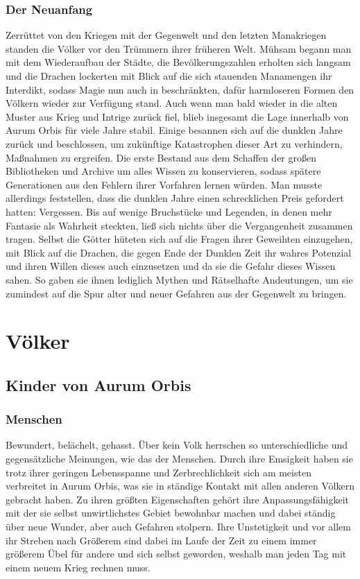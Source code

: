 \documentclass[a4paper,12pt,oneside]{book}
\begin{document}
\section{Der Neuanfang}
Zerrüttet von den Kriegen mit der Gegenwelt und den letzten Manakriegen standen die Völker vor den Trümmern ihrer früheren Welt. Mühsam begann man mit dem Wiederaufbau der Städte, die Bevölkerungszahlen erholten sich langsam und die Drachen lockerten mit Blick auf die sich stauenden Manamengen ihr Interdikt, sodass Magie nun auch in beschränkten, dafür harmloseren Formen den Völkern wieder zur Verfügung stand. Auch wenn man bald wieder in die alten Muster aus Krieg und Intrige zurück fiel, blieb insgesamt die Lage innerhalb von Aurum Orbis für viele Jahre stabil. Einige besannen sich auf die dunklen Jahre zurück und beschlossen, um zukünftige Katastrophen dieser Art zu verhindern, Maßnahmen zu ergreifen. Die erste Bestand aus dem Schaffen der großen Bibliotheken und Archive um alles Wissen zu konservieren, sodass spätere Generationen aus den Fehlern ihrer Vorfahren lernen würden. Man musste allerdings feststellen, dass die dunklen Jahre einen schrecklichen Preis gefordert hatten: Vergessen. Bis auf wenige Bruchstücke und Legenden, in denen mehr Fantasie als Wahrheit steckten, ließ sich nichts über die Vergangenheit zusammen tragen. Selbst die Götter hüteten sich auf die Fragen ihrer Geweihten einzugehen, mit Blick auf die Drachen, die gegen Ende der Dunklen Zeit ihr wahres Potenzial und ihren Willen dieses auch einzusetzen und da sie die Gefahr dieses Wissen sahen. So gaben sie ihnen lediglich Mythen und Rätselhafte Andeutungen, um sie zumindest auf die Spur alter und neuer Gefahren aus der Gegenwelt zu bringen.

\part{Völker}
\setcounter{chapter}{0}
\chapter{Kinder von Aurum Orbis}

\section{Menschen}\label{Menschen}
Bewundert, belächelt, gehasst. Über kein Volk herrschen so unterschiedliche und gegensätzliche Meinungen, wie das der Menschen. Durch ihre Emsigkeit haben sie trotz ihrer geringen Lebensspanne und Zerbrechlichkeit sich am meisten verbreitet in Aurum Orbis, was sie in ständige Kontakt mit allen anderen Völkern gebracht haben. Zu ihren größten Eigenschaften gehört ihre Anpassungsfähigkeit mit der sie selbst unwirtlichstes Gebiet bewohnbar machen und dabei ständig über neue Wunder, aber auch Gefahren stolpern. Ihre Unstetigkeit und vor allem ihr Streben nach Größerem sind dabei im Laufe der Zeit zu einem immer größerem Übel für andere und sich selbst geworden, weshalb man jeden Tag mit einem neuem Krieg rechnen muss.
\end{document}
